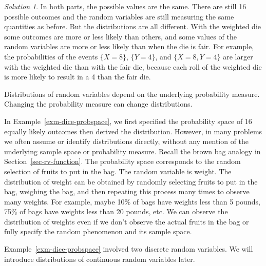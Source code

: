\documentclass[
  letterpaper,
  DIV=11,
  numbers=noendperiod]{scrreprt}
\theoremstyle{plain}
\theoremstyle{definition}
\theoremstyle{definition}
\theoremstyle{definition}
\theoremstyle{remark}
\newtheorem{refsolution}{Solution}[chapter]
\begin{document}
\begin{tcolorbox}[enhanced jigsaw, opacityback=0, rightrule=.15mm, coltitle=black, colframe=quarto-callout-tip-color-frame, toprule=.15mm, colbacktitle=quarto-callout-tip-color!10!white, opacitybacktitle=0.6, left=2mm, toptitle=1mm, breakable, title={Solution (click to expand)}, bottomtitle=1mm, colback=white, leftrule=.75mm, titlerule=0mm, arc=.35mm, bottomrule=.15mm]

\begin{refsolution}
In both parts, the possible values are the same. There are still 16
possible outcomes and the random variables are still measuring the same
quantities as before. But the distributions are all different. With the
weighted die some outcomes are more or less likely than others, and some
values of the random variables are more or less likely than when the die
is fair. For example, the probabilities of the events \(\{X = 8\}\),
\(\{Y=4\}\), and \(\{X = 8, Y=4\}\) are larger with the weighted die
than with the fair die, because each roll of the weighted die is more
likely to result in a 4 than the fair die.

\label{sol-dice-change-dist}

\end{refsolution}

\end{tcolorbox}

Distributions of random variables depend on the underlying probability
measure. Changing the probability measure can change distributions.

In Example~\ref{exm-dice-probspace}, we first specified the probability
space of 16 equally likely outcomes then derived the distribution.
However, in many problems we often assume or identify distributions
directly, without any mention of the underlying sample space or
probability measure. Recall the brown bag analogy in
Section~\ref{sec-rv-function}. The probability space corresponds to the
random selection of fruits to put in the bag. The random variable is
weight. The distribution of weight can be obtained by randomly selecting
fruits to put in the bag, weighing the bag, and then repeating this
process many times to observe many weights. For example, maybe 10\% of
bags have weights less than 5 pounds, 75\% of bags have weights less
than 20 pounds, etc. We can observe the distribution of weights even if
we don't observe the actual fruits in the bag or fully specify the
random phenomenon and its sample space.

Example~\ref{exm-dice-probspace} involved two discrete random variables.
We will introduce distributions of continuous random variables later.
\end{document}
